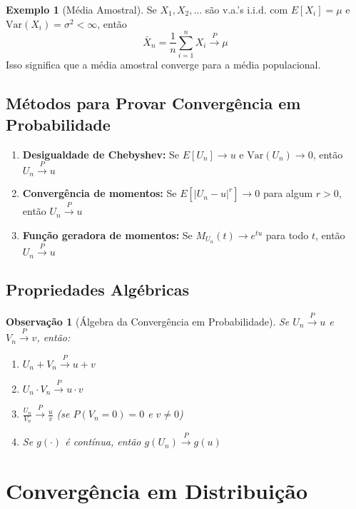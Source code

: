 \documentclass[12pt,a4paper]{article}
\theoremstyle{definition}
\newtheorem{exemplo}{Exemplo}[section]
\theoremstyle{plain}
\newtheorem{observacao}{Observação}[section]
\begin{document}
\begin{exemplo}[Média Amostral]
Se $X_1, X_2, \ldots$ são v.a.'s i.i.d. com $E[X_i] = \mu$ e $\text{Var}(X_i) = \sigma^2 < \infty$, então
\[
\bar{X}_n = \frac{1}{n}\sum_{i=1}^n X_i \xrightarrow{P} \mu
\]
Isso significa que a média amostral converge para a média populacional.
\end{exemplo}

\subsection{Métodos para Provar Convergência em Probabilidade}

\begin{enumerate}
    \item \textbf{Desigualdade de Chebyshev:} Se $E[U_n] \to u$ e $\text{Var}(U_n) \to 0$, então $U_n \xrightarrow{P} u$
    
    \item \textbf{Convergência de momentos:} Se $E[|U_n - u|^r] \to 0$ para algum $r > 0$, então $U_n \xrightarrow{P} u$
    
    \item \textbf{Função geradora de momentos:} Se $M_{U_n}(t) \to e^{tu}$ para todo $t$, então $U_n \xrightarrow{P} u$
\end{enumerate}

\subsection{Propriedades Algébricas}

\begin{observacao}[Álgebra da Convergência em Probabilidade]
Se $U_n \xrightarrow{P} u$ e $V_n \xrightarrow{P} v$, então:
\begin{enumerate}
    \item $U_n + V_n \xrightarrow{P} u + v$
    \item $U_n \cdot V_n \xrightarrow{P} u \cdot v$
    \item $\frac{U_n}{V_n} \xrightarrow{P} \frac{u}{v}$ (se $P(V_n = 0) = 0$ e $v \neq 0$)
    \item Se $g(\cdot)$ é contínua, então $g(U_n) \xrightarrow{P} g(u)$
\end{enumerate}
\end{observacao}

\section{Convergência em Distribuição}
\end{document}
